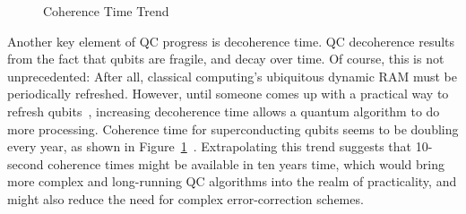 \begin{figure}[tb]
\centering
{}
\caption{Coherence Time Trend}
\label{fig:future:Coherence Time Trend}
\end{figure}

Another key element of QC progress is decoherence time.
QC decoherence results from the fact that qubits are fragile, and
decay over time.
Of course, this is not unprecedented: After all, classical computing's
ubiquitous dynamic RAM must be periodically refreshed.
However, until someone comes up with a practical way to refresh
qubits~\cite{GiorgioColangelo2017QC-SpinAngleAmplitude},
increasing decoherence time allows a quantum algorithm to do more
processing.
Coherence time for superconducting qubits seems to be doubling every year,
as shown in
Figure~\ref{fig:future:Coherence Time Trend}~\cite{IBM2016QuantumExperience}.
Extrapolating this trend suggests that 10-second coherence times might
be available in ten years time, which would bring more complex and
long-running QC algorithms into the realm of practicality, and might
also reduce the need for complex error-correction schemes.

